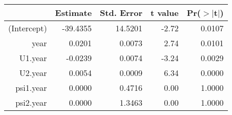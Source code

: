 
\normalsize
\begin{table}[ht]
\centering
\begin{tabular}{rrrrr}
  \hline
 & Estimate & Std. Error & t value & Pr($>$$|$t$|$) \\ 
  \hline
(Intercept) & -39.4355 & 14.5201 & -2.72 & 0.0107 \\ 
  year & 0.0201 & 0.0073 & 2.74 & 0.0101 \\ 
  U1.year & -0.0239 & 0.0074 & -3.24 & 0.0029 \\ 
  U2.year & 0.0054 & 0.0009 & 6.34 & 0.0000 \\ 
  psi1.year & 0.0000 & 0.4716 & 0.00 & 1.0000 \\ 
  psi2.year & 0.0000 & 1.3463 & 0.00 & 1.0000 \\ 
   \hline
\end{tabular}
\end{table}
